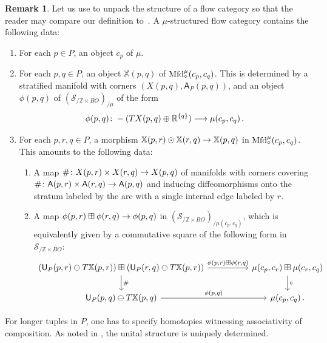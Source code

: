\documentclass[10pt]{amsart}
\numberwithin{equation}{section}
\theoremstyle{definition}
\newtheorem{rem}[prop]{Remark}
\newcommand{\Mfd}{\mathrm{Mfd}\vphantom{d}}
\newcommand{\bZ}{\mathbb{Z}}
\newcommand{\bR}{\mathbb{R}}
\newcommand{\bX}{\mathbb{X}}
\newcommand{\cS}{\mathcal{S}}
\newcommand{\sfA}{\mathsf{A}}
\newcommand{\sfU}{\mathsf{U}}
\renewcommand{\to}{\mathchoice{\longrightarrow}{\rightarrow}{}{}}
\begin{document}
\begin{rem}\label{rem:unwinding_flow_cat}
	Let us use  to unpack the structure of a flow category so that the reader may compare our definition to~\cite[Definition 3.4 and Definition 3.8]{AB}.
  A $\mu$-structured flow category contains the following data:
	\begin{enumerate}
		\item For each $p\in P$, an object $c_p$ of $\mu$.
		\item For each $p,q\in P$, an object $\bX(p,q)$ of $\Mfd^{\mu}_{\diamond}(c_{p},c_{q})$.
    This is determined by a stratified manifold with corners $(X(p,q), \sfA_P(p,q) )$, and an object $\phi(p,q)$ of $(\cS_{/ \bZ\times BO})_{/\mu}$ of the form
		\begin{align*}
			\phi(p,q)\colon   -(TX(p,q) \oplus \bR^{ \left\{ q\right\}}) \to \mu(c_{p},c_{q}) \,.
		\end{align*}
		\item For each $p,r,q \in P$, a morphism $\bX(p,r)\odot \bX(r,q) \to \bX(p,q)$ in $\Mfd^{\mu}_{\diamond}(c_{p},c_{q})$.
    This amounts to the following data:
		\begin{enumerate}
			\item A map $ \#\colon X(p,r)\times X(r,q) \to X(p,q)$ of manifolds with corners covering $\#\colon \sfA(p,r)\times \sfA(r,q) \to \sfA(p,q)$ and inducing diffeomorphisms onto the stratum labeled by the arc with a single internal edge labeled by $r$.
			\item A map $\phi(p,r) \boxplus \phi(r,q) \to \phi(p,q)$ in $(\cS_{/\bZ\times BO})_{/\mu(c_{p},c_{q})}$, which is equivalently given by a commutative square of the following form in $\cS_{/\bZ\times BO}$:
			\begin{equation*}
				\begin{tikzcd}[column sep=huge]
					(\sfU_{P}(p,r) \ominus T\bX(p,r) ) \boxplus ( \sfU_{P}(r,q) \ominus T\bX(p,r) ) \arrow[r,"{\phi(p,r)\boxplus \phi(r,q)}"] \arrow[d, "\#"]      &   \mu(c_{p},c_{r}) \boxplus \mu(c_{r},c_{q})  \arrow[d, "\circ"] \\
					\sfU_{P}(p,q) \ominus T\bX(p,q)  \arrow[r, "\phi(p{,}q)"]               &   \mu(c_{p},c_{q}) \,.
				\end{tikzcd}
			\end{equation*}
		\end{enumerate}
	\end{enumerate}
    For longer tuples in $P$, one has to specify homotopies witnessing associativity of composition. As noted in , the unital structure is uniquely determined.
\end{rem}
\end{document}
